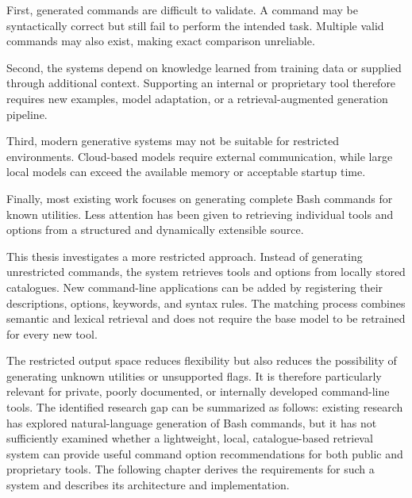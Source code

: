 First, generated commands are difficult to validate. A command may be syntactically correct but still fail to perform the intended task. Multiple valid commands may also exist, making exact comparison unreliable.

Second, the systems depend on knowledge learned from training data or supplied through additional context. Supporting an internal or proprietary tool therefore requires new examples, model adaptation, or a retrieval-augmented generation pipeline.

Third, modern generative systems may not be suitable for restricted environments. Cloud-based models require external communication, while large local models can exceed the available memory or acceptable startup time.

Finally, most existing work focuses on generating complete Bash commands for known utilities. Less attention has been given to retrieving individual tools and options from a structured and dynamically extensible source.

This thesis investigates a more restricted approach. Instead of generating unrestricted commands, the system retrieves tools and options from locally stored catalogues. New command-line applications can be added by registering their descriptions, options, keywords, and syntax rules. The matching process combines semantic and lexical retrieval and does not require the base model to be retrained for every new tool.

The restricted output space reduces flexibility but also reduces the possibility of generating unknown utilities or unsupported flags. It is therefore particularly relevant for private, poorly documented, or internally developed command-line tools.
The identified research gap can be summarized as follows: existing research has explored natural-language generation of Bash commands, but it has not sufficiently examined whether a lightweight, local, catalogue-based retrieval system can provide useful command option recommendations for both public and proprietary tools.
The following chapter derives the requirements for such a system and describes its architecture and implementation.

